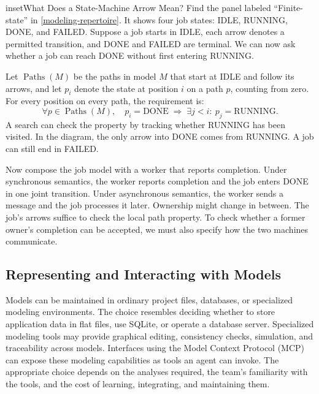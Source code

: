 \begin{bookbox}{inset}{What Does a State-Machine Arrow Mean?}
\label{inset-state-machine-arrow}
Find the panel labeled “Finite-state” in \autoref{modeling-repertoire}. It shows four job states: IDLE, RUNNING, DONE, and FAILED. Suppose a job starts in IDLE, each arrow denotes a permitted transition, and DONE and FAILED are terminal. We can now ask whether a job can reach DONE without first entering RUNNING.

Let \(\operatorname{Paths}(M)\) be the paths in model \(M\) that start at IDLE and follow its arrows, and let \(p_i\) denote the state at position \(i\) on a path \(p\), counting from zero. For every position on every path, the requirement is:
\[
\forall p \in \operatorname{Paths}(M),\quad
p_i = \mathrm{DONE} \;\Longrightarrow\;
\exists j < i:\ p_j = \mathrm{RUNNING}.
\]
A search can check the property by tracking whether RUNNING has been visited. In the diagram, the only arrow into DONE comes from RUNNING. A job can still end in FAILED.

Now compose the job model with a worker that reports completion. Under synchronous semantics, the worker reports completion and the job enters DONE in one joint transition. Under asynchronous semantics, the worker sends a message and the job processes it later. Ownership might change in between. The job's arrows suffice to check the local path property. To check whether a former owner's completion can be accepted, we must also specify how the two machines communicate.
\end{bookbox}

\subsection{Representing and Interacting with Models}\label{heading:representing-and-interacting-with-models}


Models can be maintained in ordinary project files, databases, or specialized modeling environments. The choice resembles deciding whether to store application data in flat files, use SQLite, or operate a database server. Specialized modeling tools may provide graphical editing, consistency checks, simulation, and traceability across models. Interfaces using the Model Context Protocol (MCP) can expose these modeling capabilities as tools an agent can invoke. The appropriate choice depends on the analyses required, the team's familiarity with the tools, and the cost of learning, integrating, and maintaining them.

